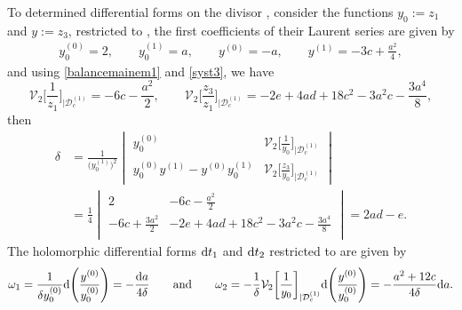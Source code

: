\documentclass[pdftex]{sigma}
\numberwithin{equation}{section}
\begin{document}
 To determined differential forms on the divisor
, consider the functions $y_0:=z_1$
and $y:=z_3$, restricted to , the
first coefficients of their Laurent series are given by
 \begin{gather*}
  y_0^{(0)}= 2, \qquad   y_0^{(1)}= a,\qquad
  y^{(0)}= -a, \qquad   y^{(1)}=-3c+\frac{a^2}{4},
 \end{gather*}
 and using \eqref{balancemainem1} and \eqref{syst3},
 we have \[\mathcal{V}_2\biggl[\frac{1}{z_1}\biggr]_{|\mathcal{D}_c^{(1)}}=-6c-\frac{a^2}{2}, \qquad
 \mathcal{V}_2\biggl[\frac{z_3}{z_1}\biggr]_{|\mathcal{D}_c^{(1)}}=-2e+4ad+18c^2-3a^2c-\frac{3a^4}{8},\]
then
\begin{align*}
 \delta &{}= \frac{1}{\bigl(y_0^{(1)}\bigr)^2}
 \begin{vmatrix}
 y_0^{(0)} & \mathcal{V}_2\bigl[\frac{1}{y_0}\bigr]_{|\mathcal{D}_c^{(1)}} \\[1mm]
 y_0^{(0)}y^{(1)}-y^{(0)}y_0^{(1)} & \mathcal{V}_2\bigl[\frac{z_3}{y_0}\bigr]_{|\mathcal{D}_c^{(1)}}
 \end{vmatrix}
 \\
 &{}= \frac{1}{4}
 \begin{vmatrix}
 2 & -6c-\frac{a^2}{2} \\
 -6c+\frac{3a^2}{2} & -2e+4ad+18c^2-3a^2c-\frac{3a^4}{8} \\
 \end{vmatrix}
 = 2ad-e.
\end{align*}
The holomorphic differential forms ${\rm d}t_1$ and ${\rm d}t_2$ restricted to
 are given by
\begin{gather*}
 \omega_1 = \frac{1}{\delta y_0^{(0)}}{\rm d}\Biggl(\frac{y^{(0)}}{y_0^{(0)}}\Biggr)=-\frac{{\rm d}a}{4\delta }
 \qquad \text{and} \qquad
 \omega_2 = -\frac{1}{\delta }\mathcal{V}_2\biggl[\frac{1}{y_0}\biggr]_{|\mathcal{D}_c^{(1)}}
 {\rm d}\Biggl(\frac{y^{(0)}}{y_0^{(0)}}\Biggr)=-\frac{a^2+12c}{4\delta}{\rm d}a.
\end{gather*}
\end{document}
